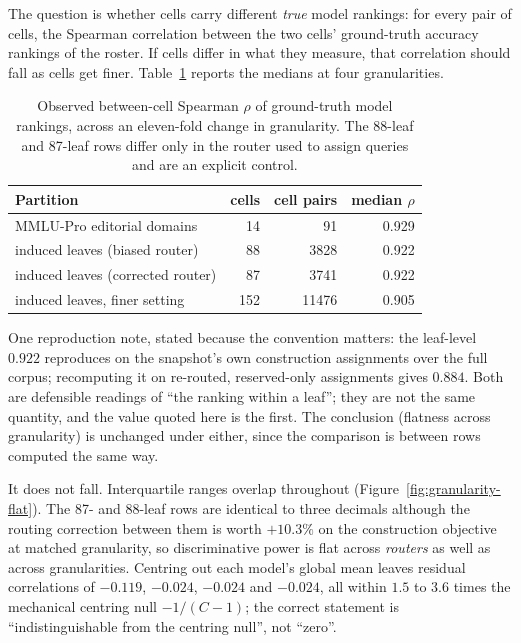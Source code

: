 The question is whether cells carry different \emph{true} model
rankings: for every pair of cells, the Spearman correlation between the
two cells' ground-truth accuracy rankings of the roster. If cells
differ in what they measure, that correlation should fall as cells get
finer. Table~\ref{tab:granularity} reports the medians at four
granularities.

\begin{table}[htbp]
\centering
\caption{Observed between-cell Spearman $\rho$ of ground-truth model
rankings, across an eleven-fold change in granularity. The 88-leaf and
87-leaf rows differ only in the router used to assign queries and are
an explicit control.}
\label{tab:granularity}
\begin{tabular}{lrrr}
\toprule
Partition & cells & cell pairs & median $\rho$ \\
\midrule
MMLU-Pro editorial domains & 14 & 91 & 0.929 \\
induced leaves (biased router) & 88 & 3828 & 0.922 \\
induced leaves (corrected router) & 87 & 3741 & 0.922 \\
induced leaves, finer setting & 152 & 11476 & 0.905 \\
\bottomrule
\end{tabular}
\par\smallskip
\footnotesize One reproduction note, stated because the convention
matters: the leaf-level $0.922$ reproduces on the snapshot's own
construction assignments over the full corpus; recomputing it on
re-routed, reserved-only assignments gives $0.884$. Both are
defensible readings of ``the ranking within a leaf''; they are not the
same quantity, and the value quoted here is the first. The conclusion
(flatness across granularity) is unchanged under either, since
the comparison is between rows computed the same way.
\end{table}

It does not fall. Interquartile ranges overlap throughout
(Figure~\ref{fig:granularity-flat}). The 87- and
88-leaf rows are identical to three decimals although the routing
correction between them is worth $+10.3\%$ on the construction
objective at matched granularity, so discriminative power is flat
across \emph{routers} as well as across granularities. Centring out
each model's global mean leaves residual correlations of $-0.119$,
$-0.024$, $-0.024$ and $-0.024$, all within $1.5$ to $3.6$ times the
mechanical centring null $-1/(C-1)$; the correct statement is
``indistinguishable from the centring null'', not ``zero''.

